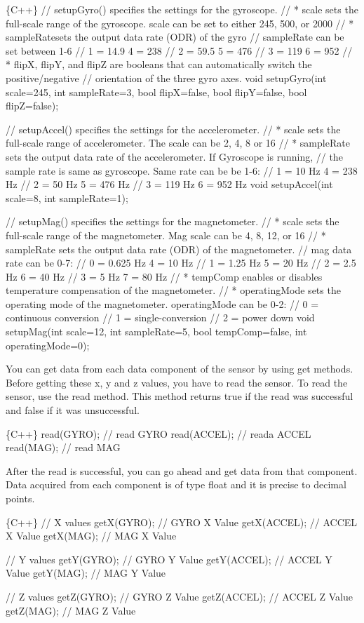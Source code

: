 \begin{DoxyCode}
\{C++\}
// setupGyro() specifies the settings for the gyroscope.
// * scale sets the full-scale range of the gyroscope. scale can be set to either 245, 500, or 2000
// * sampleRatesets the output data rate (ODR) of the gyro
//   sampleRate can be set between 1-6
//   1 = 14.9    4 = 238
//   2 = 59.5    5 = 476
//   3 = 119     6 = 952
// * flipX, flipY, and flipZ are booleans that can automatically switch the positive/negative
//   orientation of the three gyro axes.
void setupGyro(int scale=245, int sampleRate=3, bool flipX=false, bool flipY=false, bool flipZ=false);

// setupAccel() specifies the settings for the accelerometer.
// * scale sets the full-scale range of accelerometer. The scale can be 2, 4, 8 or 16
// * sampleRate sets the output data rate of the accelerometer. If Gyroscope is running,
//   the sample rate is same as gyroscope. Same rate can be be 1-6:
//   1 = 10 Hz    4 = 238 Hz
//   2 = 50 Hz    5 = 476 Hz
//   3 = 119 Hz   6 = 952 Hz
void setupAccel(int scale=8, int sampleRate=1);

// setupMag() specifies the settings for the magnetometer.
// * scale sets the full-scale range of the magnetometer. Mag scale can be 4, 8, 12, or 16
// * sampleRate sets the output data rate (ODR) of the magnetometer.
//   mag data rate can be 0-7:
//   0 = 0.625 Hz  4 = 10 Hz
//   1 = 1.25 Hz   5 = 20 Hz
//   2 = 2.5 Hz    6 = 40 Hz
//   3 = 5 Hz      7 = 80 Hz
// * tempComp enables or disables temperature compensation of the magnetometer.
// * operatingMode sets the operating mode of the magnetometer. operatingMode can be 0-2:
//   0 = continuous conversion
//   1 = single-conversion
//   2 = power down
void setupMag(int scale=12, int sampleRate=5, bool tempComp=false, int operatingMode=0);
\end{DoxyCode}


You can get data from each data component of the sensor by using {\ttfamily get} methods. Before getting these x, y and z values, you have to read the sensor. To read the sensor, use the {\ttfamily read} method. This method returns true if the read was successful and false if it was unsuccessful.


\begin{DoxyCode}
\{C++\}
read(GYRO);       // read GYRO
read(ACCEL);      // reada ACCEL
read(MAG);        // read MAG
\end{DoxyCode}


After the read is successful, you can go ahead and get data from that component. Data acquired from each component is of type {\ttfamily float} and it is precise to { decimal points}.


\begin{DoxyCode}
\{C++\}
// X values
getX(GYRO);       // GYRO X Value
getX(ACCEL);      // ACCEL X Value
getX(MAG);        // MAG X Value

// Y values
getY(GYRO);       // GYRO Y Value
getY(ACCEL);      // ACCEL Y Value
getY(MAG);        // MAG Y Value

// Z values
getZ(GYRO);       // GYRO Z Value
getZ(ACCEL);      // ACCEL Z Value
getZ(MAG);        // MAG Z Value
\end{DoxyCode}
 